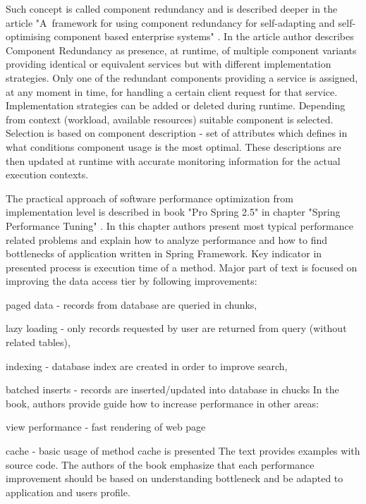 \documentclass[12pt,a4paper]{article}
\let\tempone\itemize
\let\temptwo\enditemize
\renewenvironment{itemize}{\tempone\addtolength{\itemsep}{-0.4\baselineskip}}{\temptwo}
\begin{document}
Such concept is called component redundancy and is described deeper in the article "A~framework for using component redundancy for self-adapting and self-optimising component based enterprise systems" \cite{redundancycomponent}. In the article author describes Component Redundancy as presence, at runtime, of multiple  component  variants  providing  identical or equivalent services but with different implementation strategies. Only one of the redundant components providing a service is assigned, at any moment in time, for handling a certain client request for that  service.  Implementation strategies can be added or deleted during runtime. Depending from context (workload, available resources) suitable component is selected. Selection is based on component description - set of attributes which defines in what conditions component usage is the most optimal. These descriptions are then updated at runtime with accurate monitoring information for the actual execution contexts. 

The practical approach of software performance optimization from implementation level is described in book "Pro Spring 2.5" in chapter "Spring Performance Tuning" \cite{springperformance}. In this chapter authors present most typical performance related problems and explain how to analyze performance and how to find bottlenecks of application written in Spring Framework. Key indicator in presented process is execution time of a method. Major part of text is focused on improving the data access tier by following improvements:  
\begin{itemize}
\item paged data - records from database are queried in chunks, 
\item lazy loading - only records requested by user are returned from query (without related tables), 
\item indexing - database index are created in order to improve search, 
\item batched inserts - records are inserted/updated into database in chucks
\end{itemize}
In the book, authors provide guide how to increase performance in other areas:
\begin{itemize}
\item view performance - fast rendering of web page
\item cache - basic usage of method cache is presented
\end{itemize}
The text provides examples with source code. The authors of the book emphasize that each performance improvement should be based on understanding bottleneck and be adapted to application and users profile.  
\end{document}
